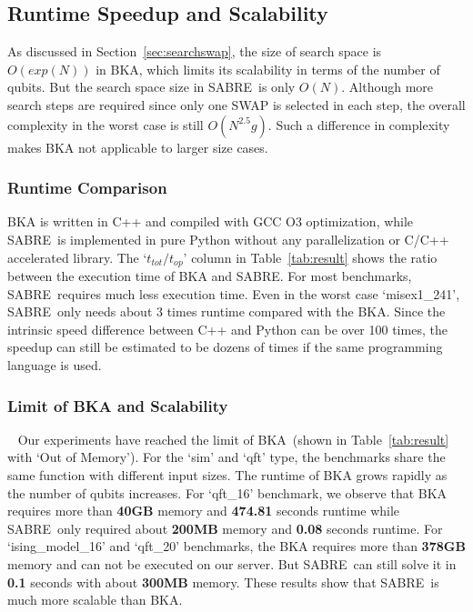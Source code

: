 \documentclass[journal,10pt,twocolumn]{IEEEtran}
\newcommand{\myalgorithmname}{SABRE}
\begin{document}
\subsection{Runtime Speedup and Scalability}
As discussed in Section~\ref{sec:searchswap}, the size of search space is $O(exp(N))$ in BKA, which limits its scalability in terms of the number of qubits. 
But the search space size in \myalgorithmname~is only $O(N)$. 
Although more search steps are required since only one SWAP is selected in each step, the overall complexity in the worst case is still $O(N^{2.5}g)$.
Such a difference in complexity makes BKA not applicable to larger size cases.

\subsubsection{Runtime Comparison} BKA is written in  C++ and compiled with GCC O3 optimization, while \myalgorithmname~is implemented in pure Python without any parallelization or C/C++ accelerated library. 
The `$t_{tot}/t_{op}$' column in Table~\ref{tab:result} shows the ratio between the execution time of BKA and \myalgorithmname. For most benchmarks, \myalgorithmname~requires much less execution time. 
Even in the worst case `misex1\_241', \myalgorithmname~only needs about 3 times runtime compared with the BKA. 
Since the intrinsic speed difference between C++ and Python can be over 100 times, the speedup can still be estimated to be dozens of times %
if the same programming language is used.

\subsubsection{Limit of BKA and Scalability}~\label{sec:limitofbestknown} Our experiments have reached the limit of BKA~(shown in Table~\ref{tab:result} with `Out of Memory').
For the `sim' and `qft' type, the benchmarks share the same function with different input sizes.
The runtime of BKA grows rapidly as the number of qubits increases. 
For `qft\_16' benchmark, we observe that BKA requires more than \textbf{40GB} memory and \textbf{474.81} seconds runtime while \myalgorithmname~only required about \textbf{200MB} memory and \textbf{0.08} seconds runtime.
For `ising\_model\_16' and `qft\_20' benchmarks, the BKA requires more than \textbf{378GB} memory and can not be executed on our server. 
But \myalgorithmname~can still solve it in \textbf{0.1} seconds with about \textbf{300MB} memory. 
These results show that \myalgorithmname~is much more scalable than BKA.
\end{document}
